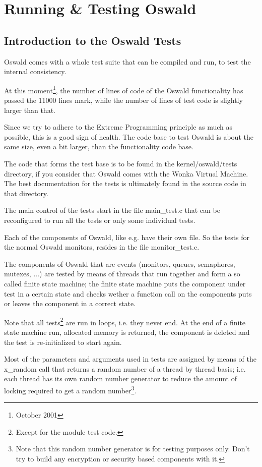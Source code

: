 %
%

\chapter{Running \& Testing Oswald}

\section{Introduction to the Oswald Tests}

Oswald comes with a whole test suite that can be compiled and run, to test
the internal consistency. 

At this moment\footnote{October 2001}, the number of lines of code of the
Oswald functionality has passed the 11000 lines mark, while the number of
lines of test code is slightly larger than that.

Since we try to adhere to the Extreme Programming principle as much as
possible, this is a good sign of health. The code base to test Oswald is
about the same size, even a bit larger, than the functionality code base.

The code that forms the test base is to be found in the
\textsf{kernel/oswald/tests} directory, if you consider that Oswald comes
with the Wonka Virtual Machine.
The best documentation for the tests is ultimately found in the source code
in that directory.

The main control of the tests start in the file \textsf{main\_test.c} that
can be reconfigured to run all the tests or only some individual tests.

Each of the components of Oswald, like e.g. have their own file. So the
tests for the normal Oswald monitors, resides in the file
\textsf{monitor\_test.c}.

The components of Oswald that are events (monitors, queues, semaphores,
mutexes, ...) are tested by means of threads that run together and form a so
called finite state machine; the finite state machine puts the component
under test in a certain state and checks wether a function call on the
components puts or leaves the component in a correct state.

Note that all tests\footnote{Except for the module test code.} are run in
loops, i.e. they never end. At the end of a finite state machine run,
allocated memory is returned, the component is deleted and the test is
re-initialized to start again.

Most of the parameters and arguments used in tests are assigned by means of
the \textsf{x\_random} call that returns a random number of a thread by
thread basis; i.e. each thread has its own random number generator to reduce
the amount of locking required to get a random number\footnote{Note that
this random number generator is for testing purposes only. Don't try to
build any encryption or security based components with it.}.

